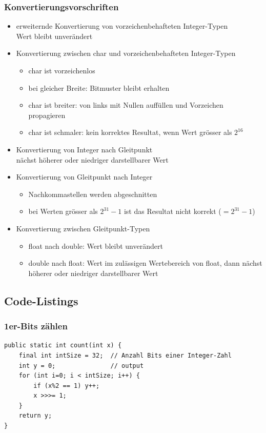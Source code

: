 \documentclass[a4paper,10pt]{article}
\begin{document}
\subsubsection{Konvertierungsvorschriften}
\begin{itemize}
	\item erweiternde Konvertierung von vorzeichenbehafteten Integer-Typen \\
		Wert bleibt unver\"andert
	\item Konvertierung zwischen char und vorzeichenbehafteten Integer-Typen
		\begin{itemize}
			\item char ist vorzeichenlos
			\item bei gleicher Breite: Bitmuster bleibt erhalten
			\item char ist breiter: von links mit Nullen auff\"ullen und Vorzeichen propagieren
			\item char ist schmaler: kein korrektes Resultat, wenn Wert gr\"osser als $2^{16}$
		\end{itemize}
	\item Konvertierung von Integer nach Gleitpunkt \\
		n\"achst h\"oherer oder niedriger darstellbarer Wert
	\item Konvertierung von Gleitpunkt nach Integer
		\begin{itemize}
			\item Nachkommastellen werden abgeschnitten
			\item bei Werten gr\"osser als $2^{31} - 1$ ist das Resultat nicht korrekt ($= 2^{31} - 1$)
		\end{itemize}
	\item Konvertierung zwischen Gleitpunkt-Typen
		\begin{itemize}
			\item float nach double: Wert bleibt unver\"andert
			\item double nach float: Wert im zul\"assigen Wertebereich von float, dann n\"achst h\"oherer oder niedriger darstellbarer Wert
		\end{itemize}
\end{itemize}

\subsection{Code-Listings}

\subsubsection{1er-Bits z\"ahlen}
\begin{lstlisting}
public static int count(int x) {
	final int intSize = 32;  // Anzahl Bits einer Integer-Zahl
	int y = 0;               // output
	for (int i=0; i < intSize; i++) { 
		if (x%2 == 1) y++;
		x >>>= 1;
	}
	return y;
}

\end{lstlisting}
\end{document}
